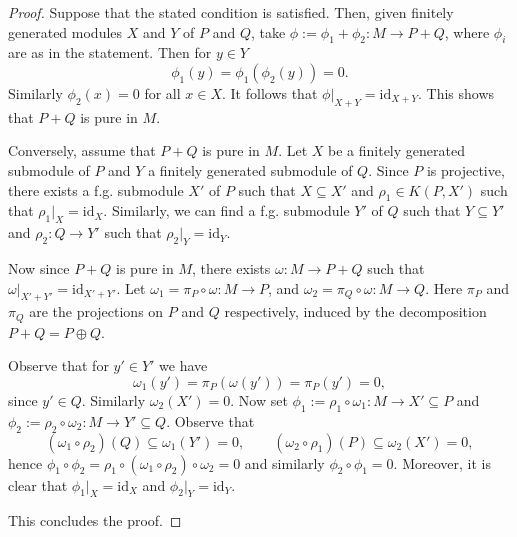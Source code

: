 \documentclass[11pt]{amsart}
\numberwithin{equation}{section}
\theoremstyle{definition}
\theoremstyle{plain}
\theoremstyle{definition}
\begin{document}
\begin{proof}
Suppose that the stated condition is satisfied. Then, given finitely generated modules $X$ and $Y$ of $P$ and $Q$, take 
$\phi:=\phi_1+\phi_2\colon M \to P+Q$, where $\phi_i$ are as in the statement. Then for $y\in Y$
$$\phi_1 (y) = \phi_1(\phi_2 (y))= 0.$$
Similarly $\phi_2 (x) =0$ for all $x\in X$. It follows that $\phi|_{X+Y}=\mathrm{id}_{X+Y}$. This shows that $P+Q$ is pure in $M$.

Conversely, assume that $P+Q$ is pure in $M$. Let $X$ be a finitely generated submodule of $P$ and $Y$ a finitely generated submodule of $Q$. 
Since $P$ is projective, there exists a f.g.
submodule $X'$ of $P$ such that $X\subseteq X'$ and $\rho_1 \in K(P, X')$ such that $\rho_1|_X= \mathrm{id}_X$.  
Similarly, we can find a f.g. submodule $Y'$ of $Q$ such that $Y\subseteq Y'$ and $\rho_2\colon Q \to Y'$ such that
$\rho_2|_Y= \mathrm{id}_Y$. 

Now since $P+Q$ is pure in $M$, there exists $\omega \colon M \to P+Q$ such that $\omega|_{X'+Y'} = \mathrm{id}_{X'+Y'}$.
Let $\omega_1= \pi_P\circ \omega \colon M\to P$, and $\omega_2=\pi_Q\circ \omega\colon M\to Q$. Here $\pi_P$ and $\pi_Q$ are the projections on 
$P$ and $Q$ respectively, induced by the decomposition $P+Q=P\oplus Q$. 

Observe that for $y'\in Y'$ we have
$$\omega_1 (y') =\pi_P (\omega (y')) = \pi_P (y') =0 ,$$
since $y'\in Q$. Similarly $\omega_2(X')=0$. 
Now set $\phi_1:= \rho_1 \circ \omega_1\colon M\to X'\subseteq P$ and $\phi_2:= \rho_2\circ \omega_2 \colon M \to Y'\subseteq Q$.
Observe that 
$$(\omega_1 \circ \rho_2)(Q) \subseteq \omega_1 (Y')=0,\qquad (\omega_2\circ \rho_1)(P) \subseteq \omega_2 (X') = 0,$$
hence $\phi_1\circ \phi_2 = \rho_1\circ (\omega_1\circ \rho_2)\circ \omega_2 =0$ and similarly $\phi_2\circ \phi_1 = 0$.
Moreover, it is clear that $\phi_1|_X= \mathrm{id}_X$ and $\phi_2|_Y= \mathrm{id}_Y$. 

This concludes the proof. 
\end{proof}
\end{document}
